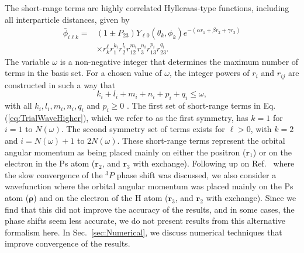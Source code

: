 \documentclass[preprint,showpacs,showkeys,preprintnumbers,amsmath,amssymb,longbibliography,pra,aps]{revtex4-1}
\begin{document}
The short-range terms are highly correlated Hylleraas-type functions, including
all interparticle distances, given by
\begin{align}
\label{eq:PhiDef}
\bar{\phi}_{i\ell k} = &\left(1 \pm P_{23}\right) Y_{\ell 0}(\theta_k,\phi_k)
e^{-(\alpha r_1 + \beta r_2 + \gamma r_3)} \nonumber \\
&\times r_k^{\ell} r_1^{k_i} r_2^{l_i} r_{12}^{m_i} r_3^{n_i} r_{13}^{p_i} r_{23}^{q_i}.
\end{align}
The variable $\omega$ is a non-negative integer that determines the maximum
number of terms in the basis set. For a chosen value of $\omega$, the integer
powers of $r_i$ and $r_{ij}$ are constructed in such a way that 
\begin{equation}
\label{eq:OmegaDef}
k_i + l_i + m_i + n_i + p_i + q_i \leq \omega,
\end{equation}
with all $k_i, l_i, m_i, n_i, q_i$ and $p_i \geq 0$ \cite{VanReeth2004}.
The first set of short-range terms in Eq. (\ref{eq:TrialWaveHigher}), which we
refer to as the first symmetry, has $k=1$ for $i=1$ to $N(\omega)$. The second
symmetry set of terms exists for $\ell > 0$, with $k=2$ and $i = N(\omega)+1$
to $2N(\omega)$. These short-range terms represent the orbital angular momentum
as being placed mainly on either the positron ($\bm{r}_1$) or on the electron
in the Ps atom ($\bm{r}_2$, and $\bm{r}_3$
with exchange). Following up on Ref.~\cite{VanReeth2004} where the slow 
convergence of the $^3P$ phase shift was discussed, we also consider a 
wavefunction where the orbital angular momentum was placed mainly on the Ps
atom ($\bm{\rho}$) and on the electron of the H atom ($\bm{r}_3$,
and $\bm{r}_2$ with exchange). Since we find that this did not improve the
accuracy of the results, and in some cases, the phase shifts seem less
accurate, we do not present results from this alternative
formalism here.
In Sec.~\ref{sec:Numerical}, we discuss numerical techniques that improve
convergence of the results.
\end{document}

